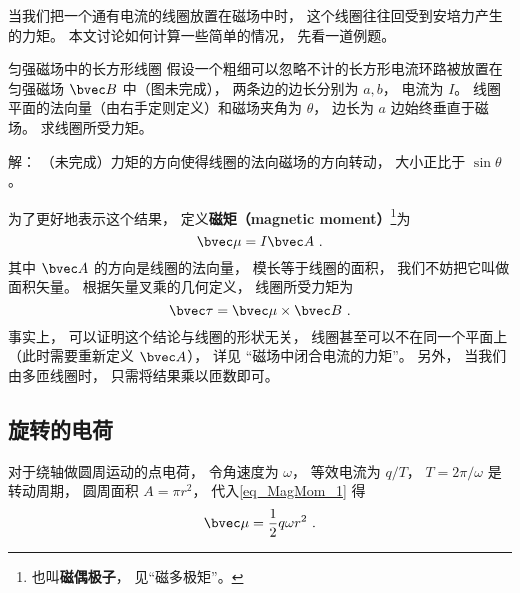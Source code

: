 
\begin{issues}
\issueTODO
\end{issues}


当我们把一个通有电流的线圈放置在磁场中时， 这个线圈往往回受到安培力产生的力矩。 本文讨论如何计算一些简单的情况， 先看一道例题。

\begin{example}{匀强磁场中的长方形线圈}
假设一个粗细可以忽略不计的长方形电流环路被放置在匀强磁场 $\bvec B$ 中（图未完成）， 两条边的边长分别为 $a, b$， 电流为 $I$。 线圈平面的法向量（由右手定则定义）和磁场夹角为 $\theta$， 边长为 $a$ 边始终垂直于磁场。 求线圈所受力矩。

解： （未完成）力矩的方向使得线圈的法向磁场的方向转动， 大小正比于 $\sin\theta$。
\end{example}

为了更好地表示这个结果， 定义\textbf{磁矩（magnetic moment）}\footnote{也叫\textbf{磁偶极子}， 见“磁多极矩”。}为
\begin{equation}\label{eq_MagMom_1}
\bvec \mu = I \bvec A~.
\end{equation}
其中 $\bvec A$ 的方向是线圈的法向量， 模长等于线圈的面积， 我们不妨把它叫做面积矢量。 根据矢量叉乘的几何定义， 线圈所受力矩为
\begin{equation}\label{eq_MagMom_2}
\bvec \tau = \bvec \mu \times \bvec B~.
\end{equation}
事实上， 可以证明这个结论与线圈的形状无关， 线圈甚至可以不在同一个平面上（此时需要重新定义 $\bvec A$）， 详见 “磁场中闭合电流的力矩”。 另外， 当我们由多匝线圈时， 只需将结果乘以匝数即可。

\subsection{旋转的电荷}
对于绕轴做圆周运动的点电荷， 令角速度为 $\omega$， 等效电流为 $q/T$， $T = 2\pi/\omega$ 是转动周期， 圆周面积 $A = \pi r^2$， 代入\autoref{eq_MagMom_1} 得
\begin{equation}
\bvec \mu = \frac{1}{2} q\omega r^2~.
\end{equation}


